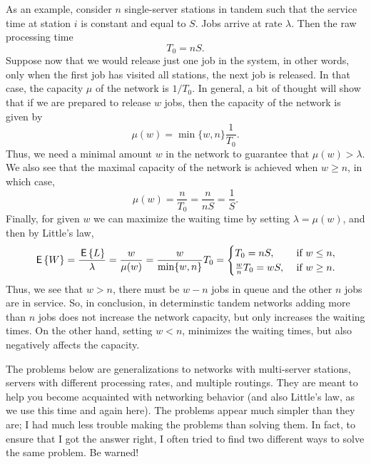 As an example, consider $n$ single-server stations in tandem such that
the service time  at station $i$ is constant and equal to
$S$. Jobs arrive at rate $\lambda$. Then  the raw processing time 
\begin{equation*}
  T_0= n S.
\end{equation*}
Suppose now that we would release just one job in the system, in other
words, only when the first job has visited all stations, the next job
is released. In that case, the capacity $\mu$ of the network is
$1/T_0$. In general, a bit of thought will show that if we are
prepared to release $w$ jobs, then the capacity of the network is
given by
\begin{equation*}
  \mu(w) = \min\{w, n\} \frac 1{T_0}.
\end{equation*}
Thus, we need a minimal amount $w$ in the network to guarantee that
$\mu(w)> \lambda$. We also see that the maximal capacity of the
network is achieved when $w\geq n$, in which case,
\begin{equation*}
  \mu(w) = \frac{n}{T_0} = \frac{n}{n S} = \frac 1S.
\end{equation*}
Finally, for given $w$ we can maximize the waiting time by setting
$\lambda = \mu(w)$, and then by Little's law,
\begin{equation*}
  \begin{split}
  \,\mathsf{E}\left\{W\right\} 
= \frac{\,\mathsf{E}\left\{L\right\}}{\lambda} = \frac{w}{\mu(w)} = \frac{w}{\min\{w, n\}} T_0 
=
\begin{cases}
  T_0=nS, & \text{ if } w\leq n, \\
  \frac{w}{n} T_0 = w S, & \text{ if } w\geq n.
\end{cases}
  \end{split}
\end{equation*}
Thus, we see that $w>n$, there must be $w-n$ jobs in queue and the
other $n$ jobs are in service. So, in conclusion, in determinstic
tandem networks adding more than $n$ jobs does not increase the
network capacity, but only increases the waiting times. On the other
hand, setting $w<n$, minimizes the waiting times, but also negatively
affects the capacity.

The problems below are generalizations to networks with multi-server
stations, servers with different processing rates, and multiple
routings. They are meant to help you become acquainted with networking
behavior (and also Little's law, as we use this time and again
here). The problems appear much simpler than they are; I had much less
trouble making the problems than solving them. In fact, to ensure that
I got the answer right, I often tried to find two different ways to
solve the same problem. Be warned!

